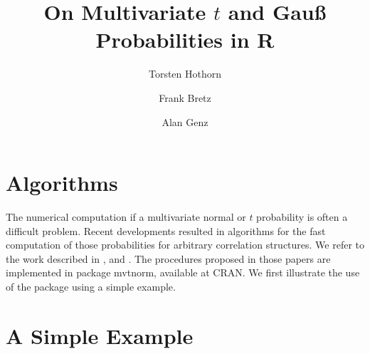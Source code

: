 \documentclass[11pt]{amsart}
\begin{document}
\title{On Multivariate $t$ and Gau{\ss} Probabilities in R}

\author{Torsten Hothorn}
\address{Friedrich-Alexander-Universit\"at Erlangen-N\"urnberg \\
Institut f\"ur Medizininformatik, Biometrie und Epidemiologie \\
Waldstra{\ss}e 6, D-91054 Erlangen}
\author{Frank Bretz}
\address{Universit\"at Hannover \\ LG Bioinformatik, FB Gartenbau \\
Herrenh\"auser Str. 2 \\ D-30419 Hannover}
\author{Alan Genz}
\address{Department of Mathematics \\ Washington State University \\
Pullman, WA 99164-3113 USA}

\maketitle

\section{Algorithms}

The numerical computation if a multivariate normal or $t$ probability is
often a difficult problem. Recent developments resulted in algorithms for
the fast computation of those probabilities for arbitrary correlation
structures. We refer to the work described in \cite{numerical-:1992},
\cite{comparison:1993} and \cite{numerical-:1999}. The procedures proposed
in those papers are implemented in package {\ttfamily mvtnorm}, available at
CRAN. We first illustrate the use of the package using a simple example.

\section{A Simple Example}
\end{document}
